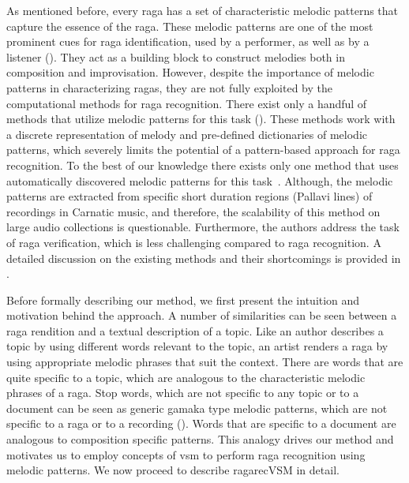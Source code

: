 As mentioned before, every \gls{raga} has a set of characteristic melodic patterns that capture the essence of the \gls{raga}. These melodic patterns are one of the most prominent cues for \gls{raga} identification, used by a performer, as well as by a listener (). They act as a building block to construct melodies both in composition and improvisation. However, despite the importance of melodic patterns in characterizing \glspl{raga}, they are not fully exploited by the computational methods for \gls{raga} recognition.  There exist only a handful of methods that utilize melodic patterns for this task (). These methods work with a discrete representation of melody and pre-defined dictionaries of melodic patterns, which severely limits the potential of a pattern-based approach for \gls{raga} recognition. To the best of our knowledge there exists only one method that uses automatically discovered melodic patterns for this task~\citep{shrey_ISMIR_2015}. Although, the melodic patterns are extracted from specific short duration regions (Pallavi lines) of recordings in Carnatic music, and therefore, the scalability of this method on large audio collections is questionable. Furthermore, the authors address the task of \gls{raga} verification, which is less challenging compared to \gls{raga} recognition. A detailed discussion on the existing methods and their shortcomings is provided in .

Before formally describing our method, we first present the intuition and motivation behind the approach. A number of similarities can be seen between a \gls{raga} rendition and a textual description of a topic. Like an author describes a topic by using different words relevant to the topic, an artist renders a \gls{raga} by using appropriate melodic phrases that suit the context. There are words that are quite specific to a topic, which are analogous to the characteristic melodic phrases of a \gls{raga}. Stop words, which are not specific to any topic or to a document can be seen as generic \gls{gamaka} type melodic patterns, which are not specific to a \gls{raga} or to a recording (). Words that are specific to a document are analogous to composition specific patterns. This analogy drives our method and motivates us to employ concepts of \gls{vsm} to perform \gls{raga} recognition using melodic patterns. We now proceed to describe \acrshort{ragarecVSM} in detail.

